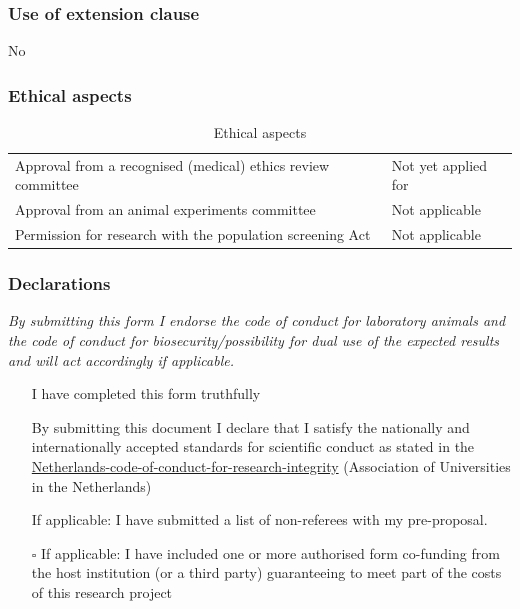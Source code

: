 \documentclass[twocolumn, serif, rga, numeric]{jote-article}
\begin{document}
 {}\subsubsection*{Use of extension clause} 

No 
 {}\subsubsection*{Ethical aspects} 

\begin{table}[h!]\sffamily\mdseries\begin{tabularx}{\columnwidth}{Xl}\toprule 
Approval from a recognised (medical) ethics review committee & Not yet applied for\tabularnewline Approval from an animal experiments committee & Not applicable\tabularnewline Permission for research with the population screening Act & Not applicable \tabularnewline \bottomrule
\end{tabularx}
\caption{Ethical aspects}
\vspace{-\baselineskip}
\end{table}



 {}\subsubsection*{Declarations} 

\emph{By submitting this form I endorse the code of conduct for laboratory animals and the code of conduct for biosecurity/possibility for dual use of the expected results and will act accordingly if applicable.}

\begin{itemize}

\item[\checkedbox] I have completed this form truthfully 
 
\item[\checkedbox] By submitting this document I declare that I satisfy the nationally and internationally accepted standards for scientific conduct as stated in the \href{https://www.nwo.nl/en/news-and-events/news/2018/09/new-netherlands-code-of-conduct-for-research-integrity.html}{Netherlands-code-of-conduct-for-research-integrity}
(Association of Universities in the Netherlands) 
\item[\checkedbox] If applicable: I have submitted a list of non-referees with my pre-proposal.

\item[$\square$] If applicable: I have included one or more authorised form co-funding from the host institution (or a third party) guaranteeing to meet part of the costs of this research project
\end{itemize}
\end{document}
